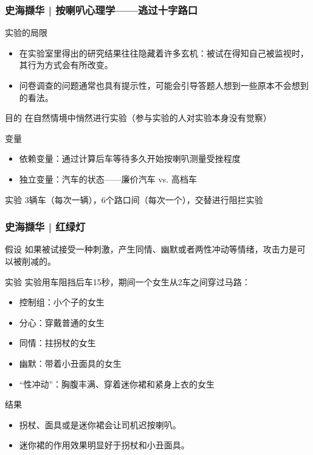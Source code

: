 \begin{frame}
  \frametitle{史海撷华 | 按喇叭心理学——逃过十字路口}
  \begin{block}{实验的局限}
    \begin{itemize}
      \item 在实验室里得出的研究结果往往隐藏着许多玄机：被试在得知自己被监视时，其行为方式会有所改变。
      \item 问卷调查的问题通常也具有提示性，可能会引导答题人想到一些原本不会想到的看法。
    \end{itemize}
  \end{block}
  \vspace{-0.5em}
  \pause
  \begin{block}{目的}
  在自然情境中悄然进行实验（参与实验的人对实验本身没有觉察）
  \end{block}
  \vspace{-0.5em}
  \pause
  \begin{block}{变量}
    \begin{itemize}
      \item 依赖变量：通过计算后车等待多久开始按喇叭测量受挫程度
      \item 独立变量：汽车的状态——廉价汽车 vs. 高档车
    \end{itemize}
  \end{block}
  \vspace{-0.5em}
  \pause
  \begin{block}{实验}
 3辆车（每次一辆），6个路口间（每次一个），交替进行阻拦实验 
  \end{block}
\end{frame}

\begin{frame}
  \frametitle{史海撷华 | 红绿灯}
  \begin{block}{假设}
    如果被试接受一种刺激，产生同情、幽默或者两性冲动等情绪，攻击力是可以被削减的。
  \end{block}
  \vspace{-0.4em}
  \pause
  \begin{block}{实验}
    实验用车阻挡后车15秒，期间一个女生从2车之间穿过马路：
    \begin{itemize}
      \item 控制组：小个子的女生
      \item 分心：穿戴普通的女生
      \item 同情：拄拐杖的女生
      \item 幽默：带着小丑面具的女生
      \item “性冲动”：胸腹丰满、穿着迷你裙和紧身上衣的女生
    \end{itemize}
  \end{block}
  \vspace{-0.4em}
  \pause
  \begin{block}{结果}
    \begin{itemize}
      \item 拐杖、面具或是迷你裙会让司机迟按喇叭。
      \item 迷你裙的作用效果明显好于拐杖和小丑面具。
    \end{itemize}
  \end{block}
\end{frame}

